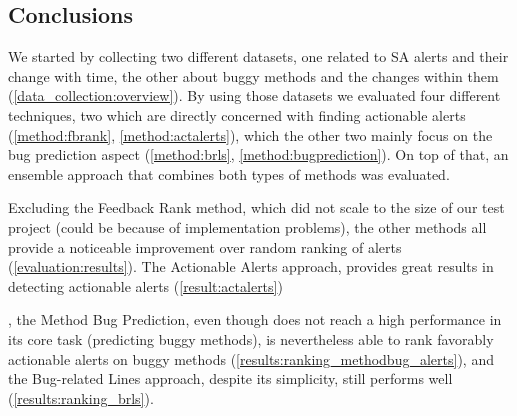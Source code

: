 \subsection{Conclusions}

We started by collecting two different datasets, one related to SA alerts and their change with time, the other about buggy methods and the changes within them (\cref{data_collection:overview}). By using those datasets we evaluated four different techniques, two which are directly concerned with finding actionable alerts (\cref{method:fbrank}, \cref{method:actalerts}), which the other two mainly focus on the bug prediction aspect (\cref{method:brls}, \cref{method:bugprediction}).
On top of that, an ensemble approach that combines both types of methods was evaluated.

Excluding the Feedback Rank method, which did not scale to the size of our test project (could be because of implementation problems), the other methods all provide a noticeable improvement over random ranking of alerts (\cref{evaluation:results}). 
 The Actionable Alerts approach, provides great results in detecting actionable alerts (\cref{result:actalerts}) 

, the Method Bug Prediction, even though does not reach a high performance in its core task (predicting buggy methods), is nevertheless able to rank favorably actionable alerts on buggy methods (\cref{results:ranking_methodbug_alerts}), and the Bug-related Lines approach, despite its simplicity, still performs well (\cref{results:ranking_brls}). 

